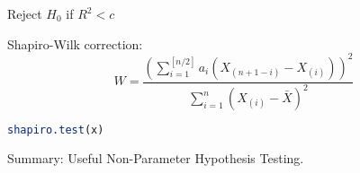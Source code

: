 \begin{itemize}
\begin{itemize}
        Reject $H_0$ if $R^2<c$

        Shapiro-Wilk correction:
        \begin{equation}
            W=\dfrac{\left(\sum_{i=1}^{[n/2]}a_i(X_{(n+1-i)}-X_{(i)})\right)^2}{\sum_{i=1}^n(X_{(i)}-\bar{X})^2}
        \end{equation}
\begin{rcode}
\begin{lstlisting}[language=R]
shapiro.test(x)
\end{lstlisting}
\end{rcode}
    \end{itemize}
\end{itemize}

\begin{point}
    Summary: Useful Non-Parameter Hypothesis Testing.
\end{point}
\\
\\
\\
\\

